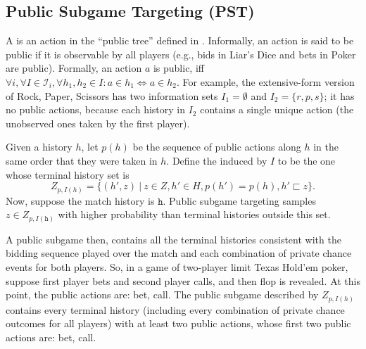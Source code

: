 \documentclass{aamas2015}
\newcommand{\cI}{\mathcal{I}}
\newcommand{\tth}{\mathtt{h}}
\newcommand{\defword}[1]{\textbf{\boldmath{#1}}}
\begin{document}
\subsection{Public Subgame Targeting (PST)}

A \defword{public action} is an action in the ``public tree'' defined in \cite{12aamas-pcs}. Informally, an action is said to be public if it is observable by all players (e.g., bids in Liar's Dice and bets in Poker are public). Formally, an action $a$ is public, iff 
$\forall i, \forall I \in \cI_i, \forall h_1,h_2\in I: a\in h_1 \Leftrightarrow a\in h_2$.
For example, the extensive-form version of Rock, Paper, Scissors has two information 
sets $I_1 = \emptyset$ and $I_2 = \{ r, p, s \}$; it has no public actions, because each history in 
$I_2$ contains a single unique action (the unobserved ones taken by the first player).  


Given a history $h$, let $p(h)$ be the sequence of public actions along $h$ in the same order that they were taken in $h$. 
Define the \defword{public subgame} induced by $I$ to be the one whose terminal history set is
\[Z_{p,I(h)} = \{(h',z)~|~z \in Z, h' \in H, p(h') = p(h), h' \sqsubset z \}.\]
Now, suppose the match history is $\tth$.
Public subgame targeting samples $z \in Z_{p,I(\tth)}$ with higher probability than terminal histories outside this set.

A public subgame then, contains all the terminal histories consistent with the bidding sequence played over the match and
each combination of private chance events for both players. So, in a game of two-player limit Texas Hold'em poker, suppose 
first player bets and second player calls, and then flop is revealed. At this point, the public actions are: bet, call. 
The public subgame described by $Z_{p,I(h)}$ contains every terminal history (including every combination of private chance 
outcomes for all players) with at least two public actions, whose first two public actions are: bet, call.  

\end{document}
